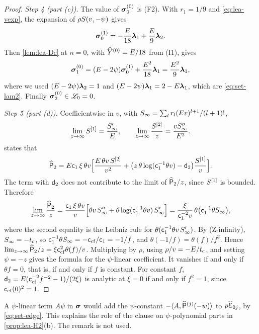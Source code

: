\begin{proof}
\emph{Step 4 (part (c)).} The value of $\boldsymbol{\sigma}_0^{(0)}$ is (F2). With $r_1=1/9$ and \cref{eq:lea-vexp}, the expansion of $\rho S(v,-\psi)$ gives
\[
\boldsymbol{\sigma}_0^{(1)}=-\frac{E}{18}\boldsymbol{\lambda}_1+\frac E9\boldsymbol{\lambda}_2.
\]
Then \cref{lem:lea-Dc} at $n=0$, with $\widehat{Y}^{(0)}=E/18$ from (I1), gives
\[
\boldsymbol{\sigma}_1^{(0)}=(E-2\psi)\boldsymbol{\sigma}_0^{(1)}+\frac{E^2}{18}\boldsymbol{\lambda}_1=\frac{E^2}{9}\boldsymbol{\lambda}_1,
\]
where we used $(E-2\psi)\boldsymbol{\lambda}_2=1$ and $(E-2\psi)\boldsymbol{\lambda}_1=2-E\boldsymbol{\lambda}_1$, which are \cref{eq:set-lam2}. Finally $\boldsymbol{\sigma}_2^{(0)}\in\mathscr{L}_0=0$.

\emph{Step 5 (part (d)).} Coefficientwise in $v$, with $S_{\infty}=\sum_lr_l(Ev)^{l+1}/(l+1)!$,
\[
\lim_{z\to\infty}S^{[1]}=\frac{S_{\infty}'}{E},\qquad \lim_{z\to\infty}\frac{S^{[2]}}{z}=\frac{vS_{\infty}''}{E^2}.
\]
 states that
\[
\widehat{\mathsf{P}}_2=E\mathsf{c}_{1}\,\xi\,\theta v\Bigl[\frac{E\,\theta v\,S^{[2]}}{v^2}+\bigl(z\,\theta\log(\mathsf{c}_{1}^{-1}\theta v)-\mathsf{d}_{2}\bigr)\frac{S^{[1]}}{v}\Bigr].
\]
The term with $\mathsf{d}_{2}$ does not contribute to the limit of $\widehat{\mathsf{P}}_2/z$, since $S^{[1]}$ is bounded. Therefore
\[
\lim_{z\to\infty}\frac{\widehat{\mathsf{P}}_2}{z}=\frac{\mathsf{c}_{1}\,\xi\,\theta v}{v}\Bigl[\theta v\,S_{\infty}''+\theta\log(\mathsf{c}_{1}^{-1}\theta v)\,S_{\infty}'\Bigr]=\frac{\xi}{\mathsf{c}_{1}^{-2}v}\,\theta\bigl(\mathsf{c}_{1}^{-1}\theta S_{\infty}\bigr),
\]
where the second equality is the Leibniz rule for $\theta(\mathsf{c}_{1}^{-1}\theta v\,S_{\infty}')$. By (Z-infinity), $S_{\infty}=-t_{\mathrm{c}}$, so $\mathsf{c}_{1}^{-1}\theta S_{\infty}=-\mathsf{c}_{\mathrm{cf}}/\mathsf{c}_{1}=-1/f$, and $\theta(-1/f)=\theta(f)/f^2$. Hence $\lim_{z\to\infty}\widehat{\mathsf{P}}_2/z=\xi\mathsf{c}_{\mathrm{cf}}^2\theta(f)/v$. Multiplying by $\rho$, using $\rho/v=-E/t_{\mathrm{c}}$, and setting $\psi=-z$ gives the formula for the $\psi$-linear coefficient. It vanishes if and only if $\theta f=0$, that is, if and only if $f$ is constant. For constant $f$, $\mathsf{d}_{2}=E(\mathsf{c}_{\mathrm{cf}}^{-2}f^{-2}-1)/(2\xi)$ is analytic at $\xi=0$ if and only if $f^2=1$, since $\mathsf{c}_{\mathrm{cf}}(0)^2=1$.
\end{proof}

\begin{rmk}
A $\psi$-linear term $A\psi$ in $\boldsymbol{\sigma}$ would add the $\psi$-constant $-\langle A,\widehat{\mathsf{P}}^{(j)}(-w)\rangle$ to $\rho\widehat{\mathcal{E}}_{0j}$, by \cref{eq:set-edge}. This explains the role of the clause on $\psi$-polynomial parts in \cref{prop:lea-H2}(b). The remark is not used.
\end{rmk}

